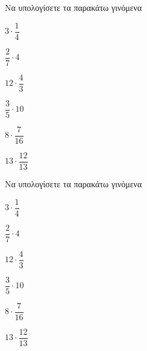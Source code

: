 Να υπολογίσετε τα παρακάτω γινόμενα
\begin{multicols}{3}
\begin{alist}
\item $ 3\cdot\dfrac{1}{4} $
\item $ \dfrac{2}{7}\cdot4 $
\item $ 12\cdot\dfrac{4}{3} $
\item $ \dfrac{3}{5}\cdot10 $
\item $ 8\cdot\dfrac{7}{16} $
\item $ 13\cdot\dfrac{12}{13} $
\end{alist}
\end{multicols}
Να υπολογίσετε τα παρακάτω γινόμενα
\begin{multicols}{3}
\begin{alist}
\item $ 3\cdot\dfrac{1}{4} $
\item $ \dfrac{2}{7}\cdot4 $
\item $ 12\cdot\dfrac{4}{3} $
\item $ \dfrac{3}{5}\cdot10 $
\item $ 8\cdot\dfrac{7}{16} $
\item $ 13\cdot\dfrac{12}{13} $
\end{alist}
\end{multicols}
